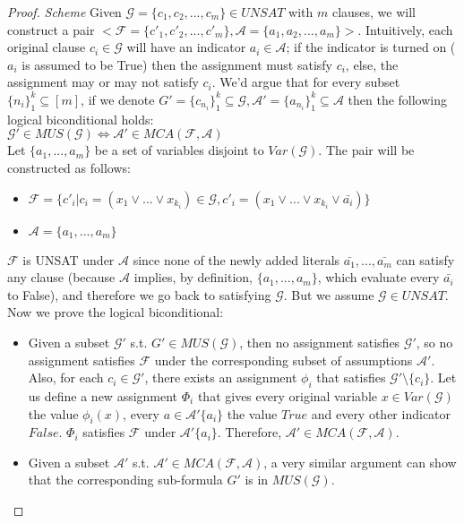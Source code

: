 \documentclass[]{article}
\begin{document}
	\begin{proof} \textit{Scheme}
		Given $ \mathcal{G}=\{c_1,c_2,...,c_m\} \in UNSAT$ with $ m $ clauses, we will construct a pair  $ <\mathcal{F}=\{c'_1,c'_2,...,c'_m\},\mathcal{A}=\{a_1,a_2,...,a_m\}> $. Intuitively, each original clause $ c_i \in \mathcal{G} $ will have an indicator $ a_i \in \mathcal{A} $; if the indicator is turned on ($ a_i$ is assumed to be True) then the assignment must satisfy $ c_i $, else, the assignment may or may not satisfy $ c_i $. We'd argue that for every subset $\{n_i\}_1^k \subseteq [m] $, if we denote  ${G}'=\{c_{n_i}\}_1^k \subseteq \mathcal{G}, \mathcal{A}'=\{a_{n_i}\}_1^k \subseteq \mathcal{A}$ then the following logical biconditional holds: \\ 
		$ \mathcal{G}'\in MUS(\mathcal{G}) \iff  \mathcal{A}'\in MCA(\mathcal{F}, \mathcal{A}) $ \\
		Let $ \{a_1,...,a_m\} $ be a set of variables disjoint to $ Var(\mathcal{G}) $. The pair will be constructed as follows:
		\begin{itemize}
			\item $ \mathcal{F}=\{c'_i | c_i = (x_1 \lor ... \lor x_{k_i})\in\mathcal{G}, c'_i= (x_1 \lor ... \lor x_{k_i} \lor \bar{a_i}) \} $
			\item $ \mathcal{A}=\{a_1,...,a_m\} $
		\end{itemize}
	$ \mathcal{F} $ is UNSAT under $ \mathcal{A} $ since none of the newly added literals $ \bar{a_1},...,\bar{a_m} $ can satisfy any clause (because $ \mathcal{A} $ implies, by definition, $ \{a_1,...,a_m\} $, which evaluate every $ \bar{a_i} $ to False), and therefore we go back to satisfying $ \mathcal{G}$. But we assume $ \mathcal{G} \in UNSAT $. \\
	Now we prove the logical biconditional:
	\begin{itemize}
		\item Given a subset $ \mathcal{G}'$ s.t. $ {G}' \in MUS(\mathcal{G}) $, then no assignment satisfies $ \mathcal{G}' $, so no assignment satisfies $ \mathcal{F} $ under the corresponding subset of assumptions $ \mathcal{A}'$. Also, for each $ c_i \in \mathcal{G}'$, there exists an assignment $ \phi_i $ that satisfies $ \mathcal{G}' \setminus \{c_i\}$. Let us define a new assignment $ \Phi_i $ that gives every original variable $ x \in Var(\mathcal{G}) $ the value $ \phi_i(x) $, every $ a \in \mathcal{A}'\{a_i\}$ the value $ True $ and every other indicator $ False $. $ \Phi_i $ satisfies $ \mathcal{F} $ under $\mathcal{A}'\{a_i\}$. Therefore, $ \mathcal{A}' \in MCA(\mathcal{F,A}) $.
		\item Given a subset $ \mathcal{A}'$ s.t. $ \mathcal{A}' \in MCA(\mathcal{F,A}) $, a very similar argument can show that the corresponding sub-formula $ {G}' $ is in $ MUS(\mathcal{G})$.
	\end{itemize}
	\end{proof}
\end{document}
